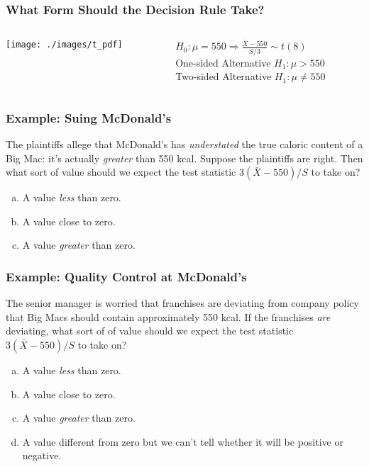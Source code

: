 \documentclass{beamer}
\begin{document}
\begin{frame}
\frametitle{What Form Should the Decision Rule Take?}
\begin{columns}
\begin{column}{6cm}
\texttt{[image: ./images/t\_pdf]}
\end{column}

\begin{column}{6cm}
$H_0\colon \mu=550 \Rightarrow \displaystyle \frac{\bar{X} - 550}{S/3} \sim t(8)$\\ \pause
\vspace{1em}
One-sided Alternative $H_1\colon \mu > 550$\\ \pause
\vspace{1em}
Two-sided Alternative $H_1\colon \mu \neq 550$ 
\end{column}

\end{columns}
 
\end{frame}
\begin{frame}
\frametitle{Example: Suing McDonald's }
The plaintiffs allege that McDonald's has \emph{understated} the true caloric content of a Big Mac: it's actually \emph{greater} than 550 kcal. \alert{Suppose the plaintiffs are right. Then what sort of value should we expect the test statistic $3(\bar{X} - 550)/S$ to take on?}

\vspace{1em}
\begin{enumerate}[(a)]
	\item A value \emph{less} than zero.
	\item A value close to zero.
	\item A value \emph{greater} than zero.
\end{enumerate}
\end{frame}
\begin{frame}
\frametitle{Example: Quality Control at McDonald's }
The senior manager is worried that franchises are deviating from company policy that Big Macs should contain approximately 550 kcal. \alert{If the franchises \emph{are} deviating, what sort of of value should we expect the test statistic $3(\bar{X} - 550)/S$ to take on?}

\vspace{1em}
\begin{enumerate}[(a)]
	\item A value \emph{less} than zero.
	\item A value close to zero.
	\item A value \emph{greater} than zero.
	\item A value different from zero but we can't tell whether it will be positive or negative.
\end{enumerate}
\end{frame}
\end{document}
